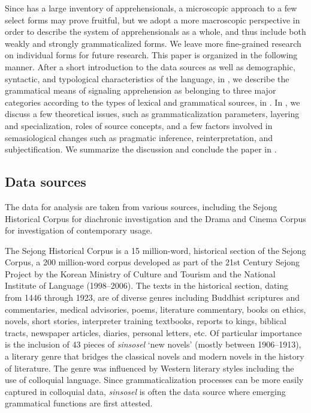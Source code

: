 \documentclass[output=paper,colorlinks,citecolor=brown]{langscibook}
\begin{document}
Since  has a large inventory of apprehensionals, a microscopic approach to a few select forms may prove fruitful, but we adopt a more macroscopic perspective in order to describe the system of  apprehensionals as a whole, and thus include both weakly and strongly grammaticalized forms. We leave more fine-grained research on individual forms for future research. This paper is organized in the following manner. After a short introduction to the data sources as well as demographic, syntactic, and typological characteristics of the  language, in , we describe the grammatical means of signaling apprehension as belonging to three major categories according to the types of lexical and grammatical sources, in . In , we discuss a few theoretical issues, such as grammaticalization parameters, layering and specialization, roles of source concepts, and a few factors involved in semasiological changes such as pragmatic inference, reinterpretation, and subjectification. We summarize the discussion and conclude the paper in .


\subsection{Data sources}
\label{subsec:datasources}

The data for analysis are taken from various sources, including the Sejong Historical Corpus for diachronic investigation and the Drama and Cinema Corpus for investigation of contemporary usage. 

The Sejong Historical Corpus is a 15 million-word, historical section of the Sejong Corpus, a 200 million-word corpus developed as part of the 21st Century Sejong Project by the Korean Ministry of Culture and Tourism and the National Institute of  Language (1998–2006). The texts in the historical section, dating from 1446 through 1923, are of diverse genres including Buddhist scriptures and commentaries, medical advisories, poems, literature commentary, books on ethics, novels, short stories, interpreter training textbooks, reports to kings, biblical tracts, newspaper articles, diaries, personal letters, etc. Of particular importance is the inclusion of 43 pieces of \textit{sinsosel} `new novels' (mostly between 1906--1913), a literary genre that bridges the classical novels and modern novels in the history of  literature. The genre was influenced by Western literary styles including the use of colloquial language. Since grammaticalization processes can be more easily captured in colloquial data, \textit{sinsosel} is often the data source where emerging grammatical functions are first attested.
\end{document}
